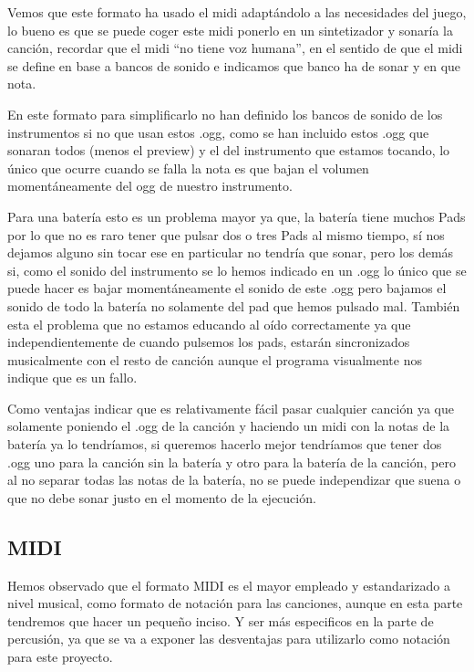 \documentclass[a4paper,11pt,oneside]{book}
\begin{document}
Vemos que este formato ha usado el midi adaptándolo a las necesidades del juego, lo bueno es que se puede coger este midi ponerlo en un sintetizador y sonaría la canción, recordar que el midi ``no tiene voz humana'', en el sentido de que el midi se define en base a bancos de sonido e indicamos que banco ha de sonar y en que nota.

En este formato para simplificarlo no han definido los bancos de sonido de los instrumentos si no que usan estos .ogg, como se han incluido estos .ogg que sonaran todos (menos el preview) y el del instrumento que estamos tocando, lo único que ocurre cuando se falla la nota es que bajan el volumen momentáneamente del ogg de nuestro instrumento.

Para una batería esto es un problema mayor ya que, la batería tiene muchos \gls{Pads} por lo que no es raro tener que pulsar dos o tres \gls{Pads} al mismo tiempo, sí nos dejamos alguno sin tocar ese en particular no tendría que sonar, pero los demás si, como el sonido del instrumento se lo hemos indicado en un .ogg lo único que se puede hacer es bajar momentáneamente el sonido de este .ogg pero bajamos el sonido de todo la batería no solamente del pad que hemos pulsado mal.
También esta el problema que no estamos educando al oído correctamente ya que independientemente de cuando pulsemos los pads, estarán sincronizados musicalmente con el resto de canción aunque el programa visualmente nos indique que es un fallo.

Como ventajas indicar que es relativamente fácil pasar cualquier canción ya que solamente poniendo el .ogg de la canción y haciendo un midi con la notas de la batería ya lo tendríamos, si queremos hacerlo mejor tendríamos que tener dos .ogg uno para la canción sin la batería y otro para la batería de la canción, pero al no separar todas las notas de la batería, no se puede independizar que suena o que no debe sonar justo en el momento de la ejecución. 


\subsection{MIDI}

Hemos observado que el formato MIDI es el mayor empleado y estandarizado a nivel musical, como formato de notación para las canciones, aunque en esta parte tendremos que hacer un pequeño inciso. Y ser más especificos en la parte de percusión, ya que se va a exponer las desventajas para utilizarlo como notación para este proyecto.
\end{document}
